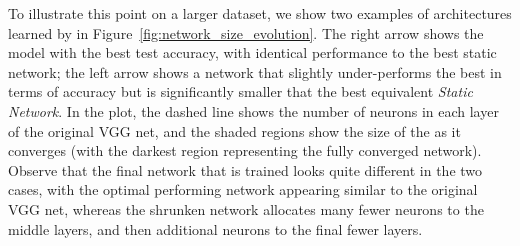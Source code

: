 To illustrate this point on a larger dataset, we show two examples of
architectures learned by \shrink in
Figure~\ref{fig:network_size_evolution}.  The right arrow shows the model with the
best test accuracy, with identical performance to the best static
network; the left arrow shows a network that slightly under-performs the best in
terms of accuracy but is significantly smaller that the best equivalent
\textit{Static Network}.  In the plot, the dashed line
shows the number of neurons in each layer of the original VGG net, and the
shaded regions show the size of the \shrink as it converges (with the darkest
region representing the fully converged network).  Observe that the final
network that is trained looks quite different in the two cases, with the optimal
performing network appearing similar to the original VGG net, whereas the
shrunken network allocates many fewer neurons to the middle layers, and then
additional neurons to the final fewer layers.


